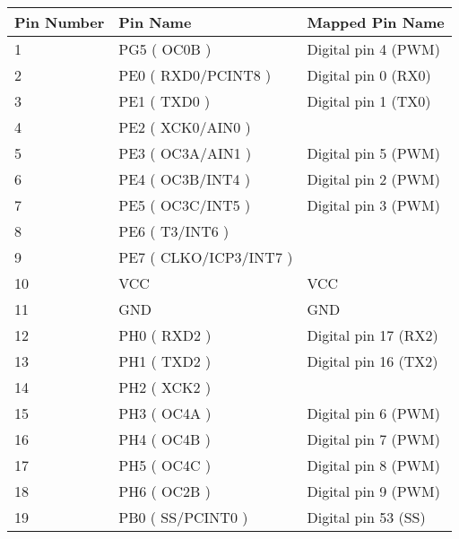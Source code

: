 \begin{longtable}[c]{|l|l|l|}
    \hline
    Pin Number & Pin Name                 & Mapped Pin Name       \\ \hline
    \endfirsthead
    \endhead
    1          & PG5 ( OC0B )             & Digital pin 4 (PWM)   \\ \hline
    2          & PE0 ( RXD0/PCINT8 )      & Digital pin 0 (RX0)   \\ \hline
    3          & PE1 ( TXD0 )             & Digital pin 1 (TX0)   \\ \hline
    4          & PE2 ( XCK0/AIN0 )        &                       \\ \hline
    5          & PE3 ( OC3A/AIN1 )        & Digital pin 5 (PWM)   \\ \hline
    6          & PE4 ( OC3B/INT4 )        & Digital pin 2 (PWM)   \\ \hline
    7          & PE5 ( OC3C/INT5 )        & Digital pin 3 (PWM)   \\ \hline
    8          & PE6 ( T3/INT6 )          &                       \\ \hline
    9          & PE7 ( CLKO/ICP3/INT7 )   &                       \\ \hline
    10         & VCC                      & VCC                   \\ \hline
    11         & GND                      & GND                   \\ \hline
    12         & PH0 ( RXD2 )             & Digital pin 17 (RX2)  \\ \hline
    13         & PH1 ( TXD2 )             & Digital pin 16 (TX2)  \\ \hline
    14         & PH2 ( XCK2 )             &                       \\ \hline
    15         & PH3 ( OC4A )             & Digital pin 6 (PWM)   \\ \hline
    16         & PH4 ( OC4B )             & Digital pin 7 (PWM)   \\ \hline
    17         & PH5 ( OC4C )             & Digital pin 8 (PWM)   \\ \hline
    18         & PH6 ( OC2B )             & Digital pin 9 (PWM)   \\ \hline
    19         & PB0 ( SS/PCINT0 )        & Digital pin 53 (SS)   \\ \hline

\end{longtable}
